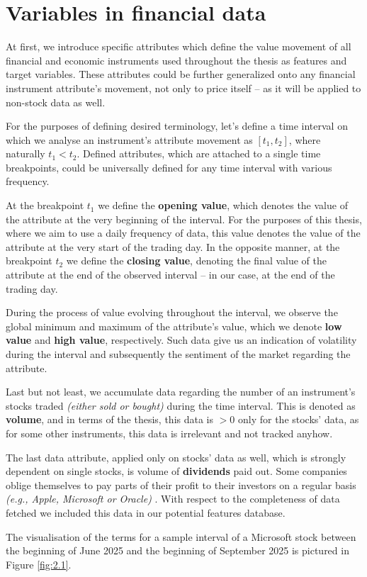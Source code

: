 \section{Variables in financial data}
At first, we introduce specific attributes which define the value movement of all financial and economic instruments used throughout the thesis 
as features and target variables. These attributes could be further generalized onto any financial instrument attribute's movement, not only to price 
itself – as it will be applied to non-stock data as well.
\par
For the purposes of defining desired terminology, let's define a time interval on which we analyse an instrument's attribute movement as $[t_1, t_2]$, where
naturally $t_1 < t_2$. Defined attributes, which are attached to a single time breakpoints, could be universally defined for any time interval with various frequency.
\par
At the breakpoint $t_1$ we define the \textbf{opening value}, which denotes the value of the attribute at the very beginning of the interval. For the purposes of this thesis,
where we aim to use a daily frequency of data, this value denotes the value of the attribute at the very start of the trading day. In the opposite manner, at the breakpoint $t_2$ we define the 
\textbf{closing value}, denoting the final value of the attribute at the end of the observed interval – in our case, at the end of the trading day.
\par
During the process of value evolving throughout the interval, we observe the global minimum and maximum of the attribute's value, which we denote \textbf{low value} and \textbf{high value}, respectively.
Such data give us an indication of volatility during the interval and subsequently the sentiment of the market regarding the attribute.
\par
Last but not least, we accumulate data regarding the number of an instrument's stocks traded \textit{(either sold or bought)} during the time interval. This is denoted as \textbf{volume}, and in terms of
the thesis, this data is $> 0$ only for the stocks' data, as for some other instruments, this data is irrelevant and not tracked anyhow.
\par
The last data attribute, applied only on stocks' data as well, which is strongly dependent on single stocks, is volume of \textbf{dividends} paid out. Some companies oblige themselves
to pay parts of their profit to their investors on a regular basis \textit{(e.g., Apple, Microsoft or Oracle)} \cite{dividendy}. With respect to the completeness of data fetched we included this data
in our potential features database.
\par
The visualisation of the terms for a sample interval of a Microsoft stock between the beginning of June 2025 and the beginning of September 2025 is pictured in Figure \ref{fig:2.1}.

